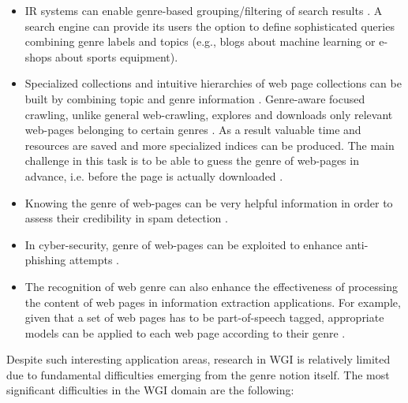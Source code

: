 \begin{itemize}
    \item IR systems can enable genre-based grouping/filtering of search results . A search engine can provide its users the option to define sophisticated queries combining genre labels and topics (e.g., blogs about machine learning or e-shops about sports equipment).
    \item Specialized collections and intuitive hierarchies of web page collections can be built by combining topic and genre information \parencite{de2009genre}. Genre-aware focused crawling, unlike general web-crawling, explores and downloads only relevant web-pages belonging to certain genres . As a result valuable time and resources are saved and more specialized indices can be produced. The main challenge in this task is to be able to guess the genre of web-pages in advance, i.e. before the page is actually downloaded \parencite{priyatam2013don_URL}. 
    \item Knowing the genre of web-pages can be very helpful information in order to assess their credibility in spam detection \parencite{Agrawal:2018}. 
    \item In cyber-security, genre of web-pages can be exploited to enhance anti-phishing attempts .
    \item The recognition of web genre can also enhance the effectiveness of processing the content of web pages in information extraction applications. For example, given that a set of web pages has to be part-of-speech tagged, appropriate models can be applied to each web page according to their genre \parencite{Nooralahzadeh2014}.
\end{itemize}

Despite such interesting application areas, research in WGI is relatively limited due to fundamental difficulties emerging from the genre notion itself. The most significant difficulties in the WGI domain are the following:

